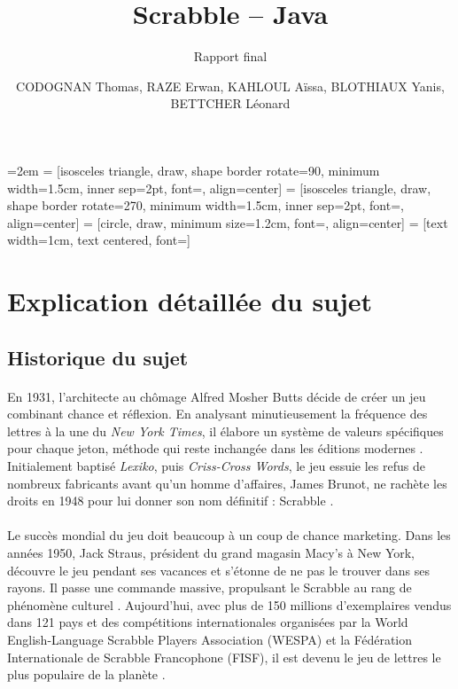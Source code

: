 \documentclass[a4paper]{article}
\title{Scrabble -- Java}
\subtitle{Rapport final}
\author{CODOGNAN Thomas, RAZE Erwan, KAHLOUL Aïssa, BLOTHIAUX Yanis, BETTCHER Léonard}
\begin{document}
    \emergencystretch=2em
	 = [isosceles triangle, draw, shape border rotate=90, minimum width=1.5cm, inner sep=2pt, font=\small, align=center]
	 = [isosceles triangle, draw, shape border rotate=270, minimum width=1.5cm, inner sep=2pt, font=\small, align=center]
	 = [circle, draw, minimum size=1.2cm, font=\small, align=center]
	 = [text width=1cm, text centered, font=\scriptsize]

\maketitle
\thispagestyle{empty}

    \section{Explication détaillée du sujet}

	\subsection{Historique du sujet}
	\paragraph{}
    En 1931, l'architecte au chômage Alfred Mosher Butts décide de créer un jeu combinant chance et réflexion. En analysant minutieusement la fréquence des lettres à la une du \textit{New York Times}, il élabore un système de valeurs spécifiques pour chaque jeton, méthode qui reste inchangée dans les éditions modernes \cite{butts1931}. Initialement baptisé \textit{Lexiko}, puis \textit{Criss-Cross Words}, le jeu essuie les refus de nombreux fabricants avant qu'un homme d'affaires, James Brunot, ne rachète les droits en 1948 pour lui donner son nom définitif : Scrabble \cite{fatsis2001}.
  
  \paragraph{}
    Le succès mondial du jeu doit beaucoup à un coup de chance marketing. Dans les années 1950, Jack Straus, président du grand magasin Macy's à New York, découvre le jeu pendant ses vacances et s'étonne de ne pas le trouver dans ses rayons. Il passe une commande massive, propulsant le Scrabble au rang de phénomène culturel \cite{fatsis2001}. Aujourd'hui, avec plus de 150 millions d'exemplaires vendus dans 121 pays et des compétitions internationales organisées par la World English-Language Scrabble Players Association (WESPA) et la Fédération Internationale de Scrabble Francophone (FISF), il est devenu le jeu de lettres le plus populaire de la planète \cite{fisf2023}.
  
\end{document}
